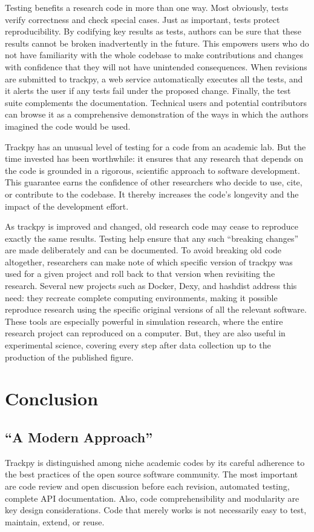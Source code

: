 Testing benefits a research code in more than one way. Most obviously, tests verify correctness and check special cases. Just as important, tests protect reproducibility. By codifying key results as tests, authors can be sure that these results cannot be broken inadvertently in the future. This empowers users who do not have familiarity with the whole codebase to make contributions and changes with confidence that they will not have unintended consequences. When revisions are submitted to trackpy, a web service automatically executes all the tests, and it alerts the user if any tests fail under the proposed change. Finally, the test suite complements the documentation. Technical users and potential contributors can browse it as a comprehensive demonstration of the ways in which the authors imagined the code would be used.

Trackpy has an unusual level of testing for a code from an academic lab. But the time invested has been worthwhile: it ensures that any research that depends on the code is grounded in a rigorous, scientific approach to software development. This guarantee earns the confidence of other researchers who decide to use, cite, or contribute to the codebase. It thereby increases the code's longevity and the impact of the development effort.

As trackpy is improved and changed, old research code may cease to reproduce exactly the same results. Testing help ensure that any such ``breaking changes'' are made deliberately and can be documented. To avoid breaking old code altogether, researchers can make note of which specific version of trackpy was used for a given project and roll back to that version when revisiting the research. Several new projects such as Docker, Dexy, and hashdist address this need: they recreate complete computing environments, making it possible reproduce research using the specific original versions of all the relevant software. These tools are especially powerful in simulation research, where the entire research project can reproduced on a computer. But, they are also useful in experimental science, covering every step after data collection up to the production of the published figure.

\section{Conclusion}
\subsection{``A Modern Approach''}
Trackpy is distinguished among niche academic codes by its careful adherence to the best practices of the open source software community\cite{Wilson2014a}. The most important are code review and open discussion before each revision, automated testing, complete API documentation. Also, code comprehensibility and modularity are key design considerations. Code that merely works is not necessarily easy to test, maintain, extend, or reuse.

